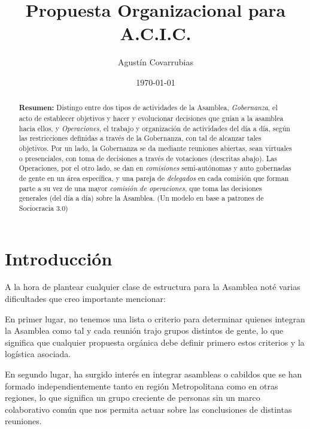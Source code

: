 \documentclass[justified]{tufte-handout} %
\title{Propuesta Organizacional para A.C.I.C.}
\author{Agustín Covarrubias}
\date{\today}
\begin{document}
\maketitle
\begin{abstract}
	\textbf{Resumen:}
	Distingo entre dos tipos de actividades de la Asamblea, \textit{Gobernanza}, el acto de establecer objetivos y hacer y evolucionar decisiones que guían a la asamblea hacia ellos, y \textit{Operaciones}, el trabajo y organización de actividades del día a día, según las restricciones definidas a través de la Gobernanza, con tal de alcanzar tales objetivos. Por un lado, la Gobernanza se da mediante reuniones abiertas, sean virtuales o presenciales, con toma de decisiones a través de votaciones (descritas abajo). Las Operaciones, por el otro lado, se dan en \textit{comisiones} semi-autónomas y auto gobernadas de gente en un área específica, y una pareja de \textit{delegados} en cada comisión que forman parte a su vez de una mayor \textit{comisión de operaciones}, que toma las decisiones generales (del día a día) sobre la Asamblea. (Un modelo en base a patrones de Sociocracia 3.0)
\end{abstract}

\section{Introducción}\label{sec:introduccion}

A la hora de plantear cualquier clase de estructura para la Asamblea noté varias dificultades que creo importante mencionar:

En primer lugar, no tenemos una lista o criterio para determinar quienes integran la Asamblea como tal y cada reunión trajo grupos distintos de gente, lo que significa que cualquier propuesta orgánica debe definir primero estos criterios y la logística asociada.

En segundo lugar, ha surgido interés en integrar asambleas o cabildos que se han formado independientemente tanto en región Metropolitana como en otras regiones, lo que significa un grupo creciente de personas sin un marco colaborativo común que nos permita actuar sobre las conclusiones de distintas reuniones.
\end{document}
